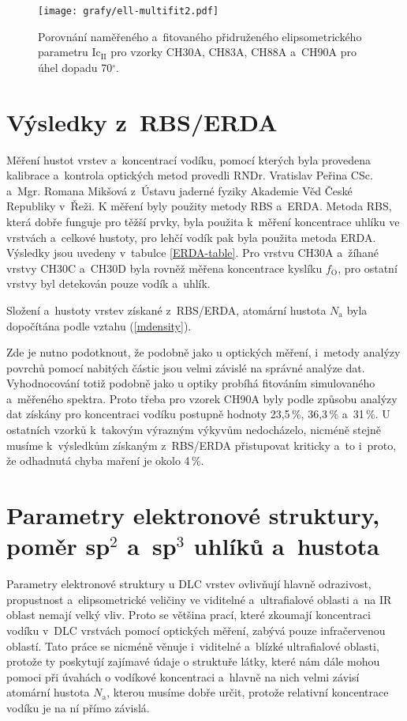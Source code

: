 \begin{figure}[htp]
	\texttt{[image: grafy/ell-multifit2.pdf]}
	\caption{Porovnání naměřeného a~fitovaného přidruženého elipsometrického parametru Ic$_{\mathrm{II}}$ pro vzorky CH30A, CH83A, CH88A a~CH90A pro úhel dopadu 70$^\circ$.}
	\label{ell-multifit2}
\end{figure}

\section{Výsledky z~RBS/ERDA}
Měření hustot vrstev a~koncentrací vodíku, pomocí kterých byla provedena kalibrace a~kontrola optických metod provedli RNDr. Vratislav Peřina CSc. a~Mgr. Romana Mikšová z~Ústavu jaderné fyziky Akademie Věd České Republiky v~Řeži. K měření byly použity metody RBS a~ERDA. Metoda RBS, která dobře funguje pro těžší prvky, byla použita k~měření koncentrace uhlíku ve vrstvách a~celkové hustoty, pro lehčí vodík pak byla použita metoda ERDA. Výsledky jsou uvedeny v~tabulce \ref{ERDA-table}. Pro vrstvu CH30A a~žíhané vrstvy CH30C a~CH30D byla rovněž měřena koncentrace kyslíku $f_\mathrm{O}$, pro ostatní vrstvy byl detekován pouze vodík a~uhlík.

\begin{table}[h!]
 \centering
	\renewcommand{\tabcolsep}{4pt}
 
 \caption{Složení a~hustoty vrstev získané z~RBS/ERDA, atomární hustota $N_\mathrm{a}$ byla dopočítána podle vztahu (\ref{mdensity}).}
\label{ERDA-table}
\end{table}

Zde je nutno podotknout, že podobně jako u optických měření, i~metody analýzy povrchů pomocí nabitých částic jsou velmi závislé na správné analýze dat. Vyhodnocování totiž podobně jako u optiky probíhá fitováním simulovaného a~měřeného spektra. Proto třeba pro vzorek CH90A byly podle způsobu analýzy dat získány pro koncentraci vodíku postupně hodnoty 23,5\,\%, 36,3\,\% a~31\,\%. U ostatních vzorků k~takovým výrazným výkyvům nedocházelo, nicméně stejně musíme k~výsledkům získaným z~RBS/ERDA přistupovat kriticky a~to i~proto, že odhadnutá chyba maření je okolo 4\,\%.

\section{Parametry elektronové struktury, poměr sp$^2$ a~sp$^3$ uhlíků a~hustota}
Parametry elektronové struktury u DLC vrstev ovlivňují hlavně odrazivost, propustnost a~elipsometrické veličiny ve viditelné a~ultrafialové oblasti a~na IR oblast nemají velký vliv. 
Proto se většina prací, které zkoumají koncentraci vodíku v~DLC vrstvách pomocí optických měření, zabývá pouze infračervenou oblastí. Tato práce se nicméně věnuje i~viditelné a~blízké ultrafialové oblasti, protože ty poskytují zajímavé údaje o struktuře látky, které nám dále mohou pomoci při úvahách o vodíkové koncentraci a~hlavně na nich velmi závisí atomární hustota $N_\mathrm{a}$, kterou musíme dobře určit, protože relativní koncentrace vodíku je na ní přímo závislá. 

